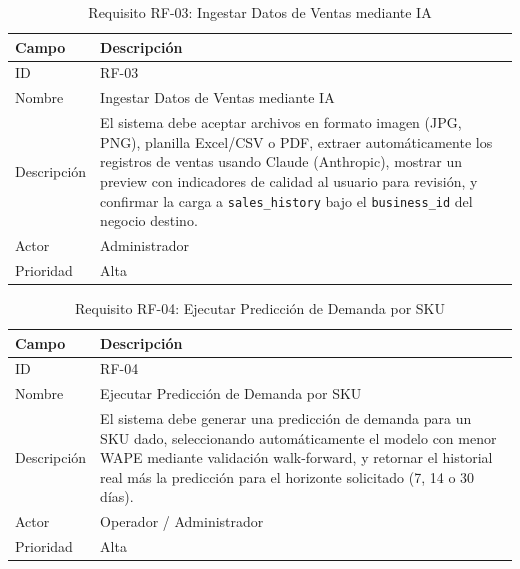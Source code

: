 \documentclass[12pt, a4paper]{report}
\begin{document}
\begin{table}[H]
  \centering
  \caption{Requisito RF-03: Ingestar Datos de Ventas mediante IA}
  \label{tab:rf03}
  \begin{tabular}{|l|p{9cm}|}
    \hline
    \textbf{Campo} & \textbf{Descripción} \\
    \hline
    ID          & RF-03 \\
    Nombre      & Ingestar Datos de Ventas mediante IA \\
    Descripción & El sistema debe aceptar archivos en formato imagen (JPG, PNG),
                  planilla Excel/CSV o PDF, extraer automáticamente los registros
                  de ventas usando Claude (Anthropic), mostrar un preview con
                  indicadores de calidad al usuario para revisión, y confirmar la
                  carga a \texttt{sales\_history} bajo el \texttt{business\_id}
                  del negocio destino. \\
    Actor       & Administrador \\
    Prioridad   & Alta \\
    \hline
  \end{tabular}
\end{table}

\begin{table}[H]
  \centering
  \caption{Requisito RF-04: Ejecutar Predicción de Demanda por SKU}
  \label{tab:rf04}
  \begin{tabular}{|l|p{9cm}|}
    \hline
    \textbf{Campo} & \textbf{Descripción} \\
    \hline
    ID          & RF-04 \\
    Nombre      & Ejecutar Predicción de Demanda por SKU \\
    Descripción & El sistema debe generar una predicción de demanda para un SKU
                  dado, seleccionando automáticamente el modelo con menor WAPE
                  mediante validación walk-forward, y retornar el historial real
                  más la predicción para el horizonte solicitado (7, 14 o 30 días). \\
    Actor       & Operador / Administrador \\
    Prioridad   & Alta \\
    \hline
  \end{tabular}
\end{table}
\end{document}
